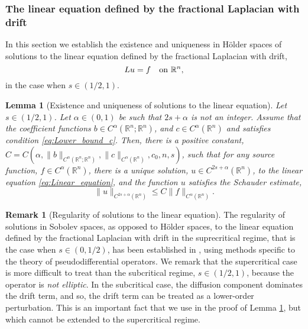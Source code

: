 \documentclass[11pt,reqno]{amsart}
\newtheorem{lem}[thm]{Lemma}
\theoremstyle{definition}
\newtheorem{rmk}[thm]{Remark}
\theoremstyle{remark}
\begin{document}
\subsubsection{The linear equation defined by the fractional Laplacian with drift}
\label{subsec:Linear_equation}
In this section we establish the existence and uniqueness in H\"older spaces of solutions to the linear equation defined by the fractional Laplacian with drift, 
\begin{equation}
\label{eq:Linear_equation}
Lu=f\quad\hbox{on } {\mathbb{R}}^n,
\end{equation}
in the case when $s\in (1/2,1)$. 

\begin{lem}[Existence and uniqueness of solutions to the linear equation]
\label{lem:Existence_uniqueness_linear_equation}
Let $s\in(1/2,1)$. Let $\alpha \in (0,1)$ be such that $2s+\alpha$ is not an integer. Assume that the coefficient functions $b\in C^{\alpha}({\mathbb{R}}^n;{\mathbb{R}}^n)$, and $c \in C^{\alpha}({\mathbb{R}}^n)$ and satisfies condition \eqref{eq:Lower_bound_c}. Then, there is a positive constant, $C=C(\alpha, \|b\|_{C^{\alpha}({\mathbb{R}}^n;{\mathbb{R}}^n)}, \|c\|_{C^{\alpha}({\mathbb{R}}^n)}, c_0, n, s)$, such that for any source function, $f \in C^{\alpha}({\mathbb{R}}^n)$, there is a unique solution, $u \in C^{2s+\alpha}({\mathbb{R}}^n)$, to the linear equation \eqref{eq:Linear_equation}, and the function $u$ satisfies the Schauder estimate,
\begin{equation}
\label{eq:Holder_estimate}
\|u\|_{C^{2s+\alpha}({\mathbb{R}}^n)} \leq C\|f\|_{C^{\alpha}({\mathbb{R}}^n)}.
\end{equation}
\end{lem}

\begin{rmk}[Regularity of solutions to the linear equation]
The regularity of solutions in Sobolev spaces, as opposed to H\"older spaces, to the linear equation defined by the fractional Laplacian with drift in the suprecritical regime, that is the case when $s\in (0,1/2)$, has been established in \cite{Epstein_Pop_2013}, using methods specific to the theory of pseudodifferential operators. We remark that the supercritical case is more difficult to treat than the subcritical regime, $s\in (1/2,1)$, because the operator is \emph{not elliptic}. In the subcritical case, the diffusion component dominates the drift term, and so, the drift term can be treated as a lower-order perturbation. This is an important fact that we use in the proof of Lemma \ref{lem:Existence_uniqueness_linear_equation}, but which cannot be extended to the supercritical regime.
\end{rmk}
\end{document}
